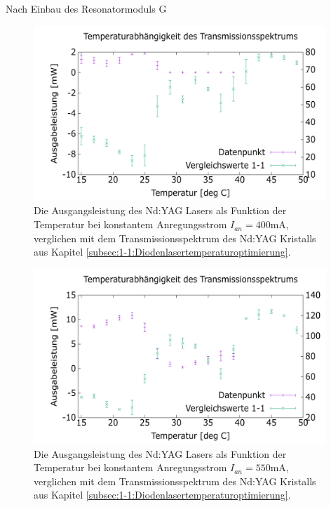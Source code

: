 \documentclass[../../main.tex]{subfiles}
\begin{document}
    
    Nach Einbau des Resonatormoduls G 

    \begin{figure}
        \centering
        \includegraphics[width=11cm]{../../Bilddateien/4/PowerOverTemperature_400mA_comp.png}
        \caption{Die Ausgangsleistung des Nd:YAG Lasers als Funktion der Temperatur bei konstantem Anregungsstrom $I_{\textit{an}} = 400\si{\mA}$, verglichen mit dem Transmissionsspektrum des Nd:YAG Kristalls aus Kapitel \ref{subsec:1-1:Diodenlasertemperaturoptimierung}.}
    \end{figure}

    \begin{figure}
        \centering
        \includegraphics[width=11cm]{../../Bilddateien/4/PowerOverTemperature_550mA_comp.png}
        \caption{Die Ausgangsleistung des Nd:YAG Lasers als Funktion der Temperatur bei konstantem Anregungsstrom $I_{\textit{an}} = 550\si{\mA}$, verglichen mit dem Transmissionsspektrum des Nd:YAG Kristalls aus Kapitel \ref{subsec:1-1:Diodenlasertemperaturoptimierung}.}
    \end{figure}
\end{document}
